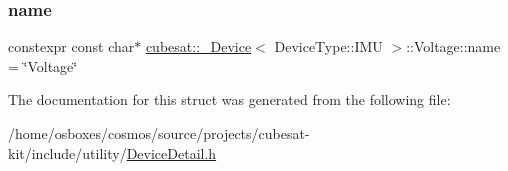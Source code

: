 \subsubsection{\texorpdfstring{name}{name}}
{\footnotesize\ttfamily constexpr const char$\ast$ \hyperlink{structcubesat_1_1__Device}{cubesat\+::\+\_\+\+Device}$<$ Device\+Type\+::\+I\+MU $>$\+::Voltage\+::name = \char`\"{}Voltage\char`\"{}\hspace{0.3cm}{\ttfamily [static]}}



The documentation for this struct was generated from the following file\+:\begin{DoxyCompactItemize}
\item 
/home/osboxes/cosmos/source/projects/cubesat-\/kit/include/utility/\hyperlink{DeviceDetail_8h}{Device\+Detail.\+h}\end{DoxyCompactItemize}
